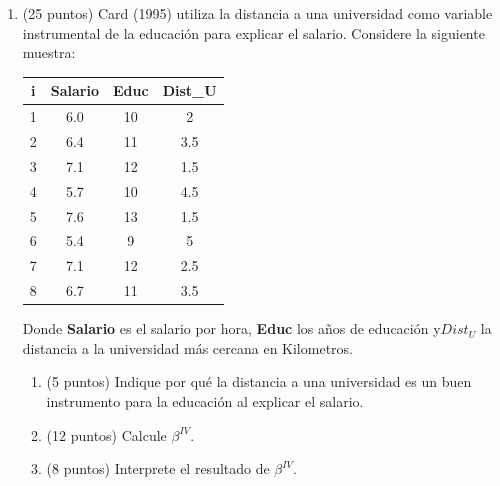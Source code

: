 \documentclass[10pt,a4paper]{article}
\begin{document}
\begin{enumerate}
    

\item (25 puntos) Card (1995) utiliza la distancia a una universidad como variable instrumental de la educación para explicar el salario. Considere la siguiente muestra:
\begin{center}
\begin{tabular}{|c|c|c|c|}
\hline
i & Salario & Educ & Dist_U \\
\hline
1 & 6.0 & 10 & 2 \\
2 & 6.4 & 11 & 3.5 \\
3 & 7.1 & 12 & 1.5 \\
4 & 5.7 & 10 & 4.5 \\
5 & 7.6 & 13 & 1.5 \\
6 & 5.4 &  9 & 5 \\
7 & 7.1 & 12 & 2.5 \\
8 & 6.7 & 11 & 3.5 \\
\hline
\end{tabular}
\end{center}
Donde \textbf{Salario} es el salario por hora, \textbf{Educ} los años de educación y\textbf{$Dist_U$} la distancia a la universidad más cercana en Kilometros.

\begin{enumerate}
    \item (5 puntos) Indique por qué la distancia a una universidad es un buen instrumento para la educación al explicar el salario.
    \item (12 puntos) Calcule \(\beta^{IV}\).
    \item (8 puntos) Interprete el resultado de \(\beta^{IV}\).
\end{enumerate}






\end{enumerate}
\end{document}
